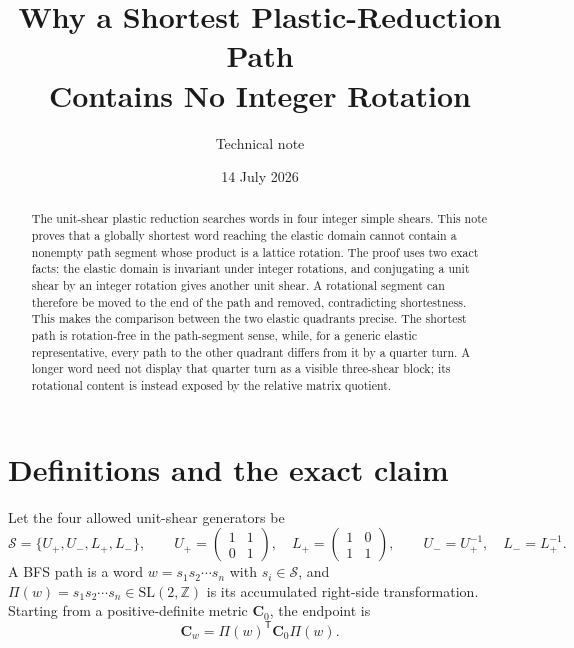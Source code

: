\documentclass[11pt]{article}
\title{Why a Shortest Plastic-Reduction Path\\
Contains No Integer Rotation}
\author{Technical note}
\date{14 July 2026}
\newcommand{\trans}{\mathsf{T}}
\newcommand{\Sset}{\mathcal S}
\newcommand{\SLZ}{\mathrm{SL}(2,\mathbb Z)}
\newcommand{\wordprod}{\Pi}
\newcommand{\Uplus}{U_{+}}
\newcommand{\Uminus}{U_{-}}
\newcommand{\Lplus}{L_{+}}
\newcommand{\Lminus}{L_{-}}
\theoremstyle{definition}
\begin{document}
\maketitle

\begin{abstract}
The unit-shear plastic reduction searches words in four integer simple
shears.  This note proves that a globally shortest word reaching the elastic
domain cannot contain a nonempty path segment whose product is a lattice
rotation.  The proof uses two exact facts: the elastic domain is invariant
under integer rotations, and conjugating a unit shear by an integer rotation
gives another unit shear.  A rotational segment can therefore be moved to
the end of the path and removed, contradicting shortestness.  This makes the
comparison between the two elastic quadrants precise.  The shortest path is
rotation-free in the path-segment sense, while, for a generic elastic
representative, every path to the other quadrant differs from it by a
quarter turn.  A longer word need not display that quarter turn as a visible
three-shear block; its rotational content is instead exposed by the relative
matrix quotient.
\end{abstract}

\section{Definitions and the exact claim}

Let the four allowed unit-shear generators be
\begin{equation}
 \Sset=\{\Uplus,\Uminus,\Lplus,\Lminus\},
 \qquad
 \Uplus=\begin{pmatrix}1&1\\0&1\end{pmatrix},\quad
 \Lplus=\begin{pmatrix}1&0\\1&1\end{pmatrix},
 \qquad
 \Uminus=\Uplus^{-1},\quad \Lminus=\Lplus^{-1}.
 \label{eq:generators}
\end{equation}
A BFS path is a word \(w=s_1s_2\cdots s_n\) with \(s_i\in\Sset\), and
\(\wordprod(w)=s_1s_2\cdots s_n\in\SLZ\) is its accumulated right-side
transformation.  Starting from a positive-definite metric \(\mathbf C_0\),
the endpoint is
\begin{equation}
 \mathbf C_w=\wordprod(w)^\trans\mathbf C_0\wordprod(w).
 \label{eq:pathaction}
\end{equation}
\end{document}
